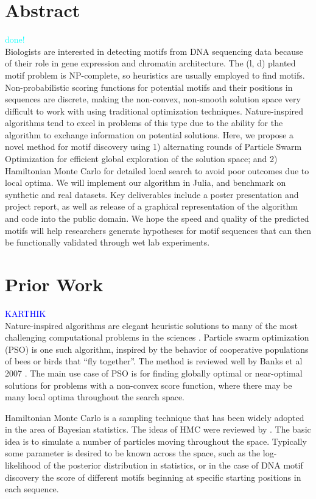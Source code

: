 \documentclass{article}
\begin{document}
\section{Abstract}
\textcolor{cyan}{done!} \\
Biologists are interested in detecting motifs from DNA sequencing data because of their role in gene expression and chromatin architecture.
The (l, d) planted motif problem is NP-complete, so heuristics are usually employed to find motifs. Non-probabilistic scoring functions for potential motifs and their positions in sequences are discrete, making the non-convex, non-smooth solution space very difficult to work with using traditional optimization techniques. Nature-inspired algorithms tend to excel in problems of this type due to the ability for the algorithm to exchange information on potential solutions. Here, we propose a novel method for motif discovery using 1) alternating rounds of Particle Swarm Optimization for efficient global exploration of the solution space; and 2) Hamiltonian Monte Carlo for detailed local search to avoid poor outcomes due to local optima. We will implement our algorithm in Julia, and benchmark on synthetic and real datasets. Key deliverables include a poster presentation and project report, as well as release of a graphical representation of the algorithm and code into the public domain. We hope the speed and quality of the predicted motifs will help researchers generate hypotheses for motif sequences that can then be functionally validated through wet lab experiments.
\section{Prior Work}
\textcolor{blue}{KARTHIK} \\
Nature-inspired algorithms are elegant heuristic solutions to many of the most challenging computational problems in the sciences \cite{fister2013brief}. Particle swarm optimization (PSO) is one such algorithm, inspired by the behavior of cooperative populations of bees or birds that ``fly together''. The method is reviewed well by Banks et al 2007 \cite{banks2007review}. The main use case of PSO is for finding globally optimal or near-optimal solutions for problems with a non-convex score function, where there may be many local optima throughout the search space. 
  
    
Hamiltonian Monte Carlo is a sampling technique that has been widely adopted in the area of Bayesian statistics. The ideas of HMC were reviewed by \cite{betancourt2017conceptual}. The basic idea is to simulate a number of particles moving throughout the space. Typically some parameter is desired to be known across the space, such as the log-likelihood of the posterior distribution in statistics, or in the case of DNA motif discovery the score of different motifs beginning at specific starting positions in each sequence.
\end{document}
